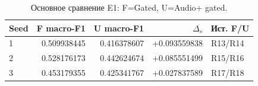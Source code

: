 \begin{table}[H]\centering\small
\setlength{\tabcolsep}{4pt}
\caption{Основное сравнение E1: F=Gated, U=Audio+ gated.}\label{tab:paired}
\begin{tabular}{lrrrl}
\toprule
Seed & F macro-F1 & U macro-F1 & $\Delta_s$ & Ист. F/U \\
\midrule
1 & 0.509938445 & 0.416378607 & +0.093559838 & R13/R14 \\
2 & 0.528176173 & 0.442624674 & +0.085551499 & R15/R16 \\
3 & 0.453179355 & 0.425341767 & +0.027837589 & R17/R18 \\
\bottomrule
\end{tabular}
\end{table}
